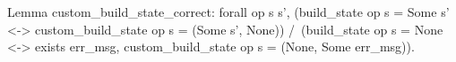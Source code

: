 Lemma custom_build_state_correct:
   forall op s s',
      (build_state op s = Some s' <->
      custom_build_state op s = (Some s', None))
      /\
      (build_state op s = None <->
      exists err_msg, custom_build_state op s = (None, Some err_msg)).